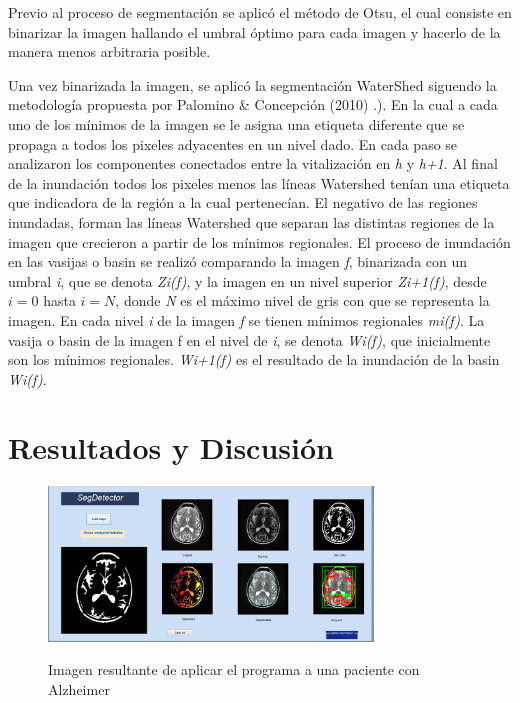 \documentclass[12pt]{article}
\begin{document}
Previo al proceso de segmentación se aplicó el método de Otsu, el cual consiste en binarizar la imagen hallando el umbral óptimo para cada imagen y hacerlo de la manera menos arbitraria posible.

Una vez binarizada la imagen, se aplicó la segmentación WaterShed siguendo la metodología propuesta por Palomino \& Concepción (2010) \cite{palomino2010watershed}.).  En la cual a cada uno de los mínimos de la imagen se le asigna una etiqueta diferente que se propaga a todos los pixeles adyacentes en un nivel dado. En cada paso se analizaron los componentes conectados entre la vitalización en \textit{h} y \textit{h+1}. Al final de la inundación todos los pixeles menos las líneas Watershed tenían una etiqueta que indicadora de la región a la cual pertenecían. El negativo de las regiones inundadas, forman las líneas Watershed que separan las distintas regiones de la imagen que crecieron a partir de los mínimos regionales. El proceso de inundación en las vasijas o basin se realizó comparando la imagen \textit{f}, binarizada con un umbral \textit{i}, que se denota \textit{Zi(f)}, y la imagen en un nivel superior \textit{Zi+1(f)}, desde $i = 0$ hasta $i = N$, donde \textit{N} es el máximo nivel de gris con que se representa la imagen. En cada nivel \textit{i} de la imagen \textit{f} se tienen mínimos regionales \textit{mi(f)}. La vasija o basin de la imagen f en el nivel de \textit{i}, se denota \textit{Wi(f)}, que inicialmente son los mínimos regionales.
\textit{Wi+1(f)} es el resultado de la inundación de la basin \textit{Wi(f)}.

\section{\color{Black}Resultados y Discusión}
\justifying

 
 
 
 \begin{figure}[htb]
\centering
\includegraphics[width=0.77\textwidth]{Resultado}\\
\caption{ Imagen resultante de aplicar el programa a una paciente con Alzheimer } \small
\label{rs}
\end{figure}
 
\end{document}
